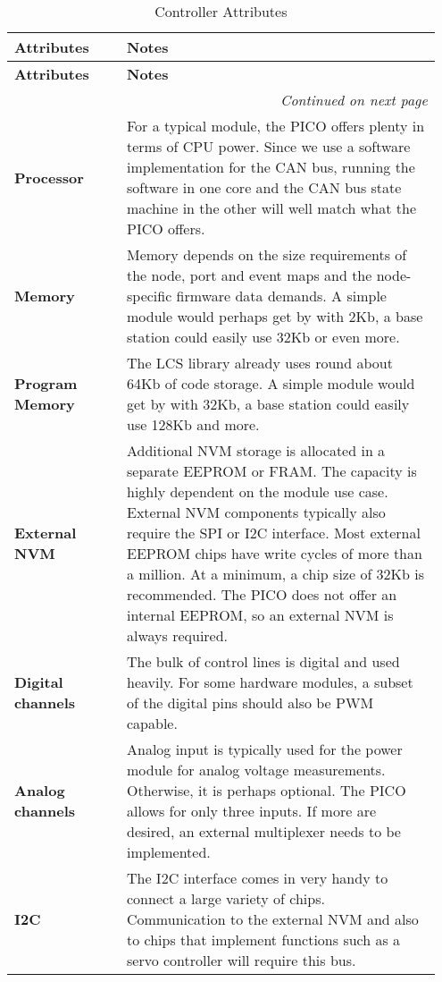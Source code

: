 \begin{longtable}{@{}p{0.25\linewidth}p{0.7\linewidth}@{}}
    \caption{Controller Attributes} \\
    \toprule
    \textbf{Attributes} & \textbf{Notes} \\
    \midrule
    \endfirsthead
    \toprule
    \textbf{Attributes} & \textbf{Notes} \\
    \midrule
    \endhead
    \midrule
    \multicolumn{2}{r}{\textit{Continued on next page}} \\
    \midrule
    \endfoot
    \bottomrule
    \endlastfoot
    \textbf{Processor} & For a typical module, the PICO offers plenty in terms of CPU power. Since we use a software implementation for the CAN bus, running the software in one core and the CAN bus state machine in the other will well match what the PICO offers. \\
    \midrule
    \textbf{Memory} & Memory depends on the size requirements of the node, port and event maps and the node-specific firmware data demands. A simple module would perhaps get by with 2Kb, a base station could easily use 32Kb or even more. \\
    \midrule
    \textbf{Program Memory} & The LCS library already uses round about 64Kb of code storage. A simple module would get by with 32Kb, a base station could easily use 128Kb and more. \\
    \midrule
    \textbf{External NVM} & Additional NVM storage is allocated in a separate EEPROM or FRAM. The capacity is highly dependent on the module use case. External NVM components typically also require the SPI or I2C interface. Most external EEPROM chips have write cycles of more than a million. At a minimum, a chip size of 32Kb is recommended. The PICO does not offer an internal EEPROM, so an external NVM is always required. \\
    \midrule
    \textbf{Digital channels} & The bulk of control lines is digital and used heavily. For some hardware modules, a subset of the digital pins should also be PWM capable. \\
    \midrule
    \textbf{Analog channels} & Analog input is typically used for the power module for analog voltage measurements. Otherwise, it is perhaps optional. The PICO allows for only three inputs. If more are desired, an external multiplexer needs to be implemented. \\
    \midrule
    \textbf{I2C} & The I2C interface comes in very handy to connect a large variety of chips. Communication to the external NVM and also to chips that implement functions such as a servo controller will require this bus. \\

\end{longtable}
